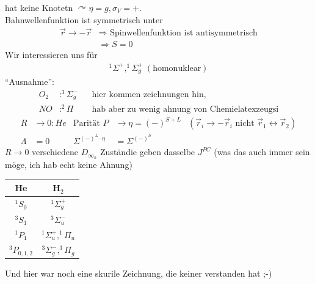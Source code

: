 hat keine Knotetn $\curvearrowright \eta = g, \sigma_V = +$.
\\
Bahnwellenfunktion ist symmetrisch unter
	\begin{align*}
		\vec{r} \rightarrow - \vec{r} &\Rightarrow \text{ Spinwellenfunktion ist antisymmetrisch}\\
		&\Rightarrow S = 0
	\end{align*}
Wir interessieren uns für 	
	\begin{align*}
		^1\Sigma^+, ^1\Sigma^+_g ~(\text{homonuklear})
	\end{align*}
``Ausnahme'':
	\begin{align*}
		O_2 &: ^3\Sigma^-_g & &\text{hier kommen zeichnungen hin, }\\
		NO &: ^2\Pi & &\text{hab aber zu wenig ahnung von Chemielatexzeugsi}
	\end{align*}
	\begin{align*}
		R &\rightarrow 0 : He &\text{Parität } P &\rightarrow \eta = (-)^{S + L}
		&(\vec{r}_i \rightarrow -\vec{r}_i \text{ nicht } \vec{r}_1 \leftrightarrow \vec{r}_2) \\
		\Lambda &= 0 &\Sigma^{(-)^L \cdot \eta} &= \Sigma^{(-)^S}
	\end{align*}
$R \rightarrow 0$ verschiedene $D_{\infty_h}$ Zuständie geben dasselbe $J^{PC}$ (was das auch immer sein möge, ich hab echt keine Ahnung)

	\begin{center}
	\begin{tabular}{c | c}
		He & H$_2$ \\ \hline 
		$^1S_0$ & $^1\Sigma^+_g$ \\
		$^3S_1$ & $^3\Sigma^-_u$ \\
		$^1P_1$ & $^1\Sigma^+_u, ^1\Pi_u$\\
		$^3P_{0,1,2}$ & $^3\Sigma^-_g, ^3\Pi_g$\\
	\end{tabular}
	\end{center}
Und hier war noch eine skurile Zeichnung, die keiner verstanden hat ;-)\\

